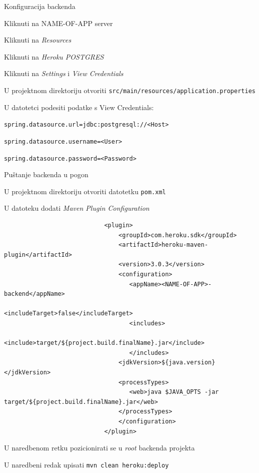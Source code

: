 				\begin{packed_item}
					\item Konfiguracija backenda
					\begin{packed_enum}
						\item Kliknuti na NAME-OF-APP server
						\item Kliknuti na \textit{Resources}
						\item Kliknuti na \textit{Heroku POSTGRES}
						\item Kliknuti na \textit{Settings} i \textit{View Credentials}
						\item U projektnom direktoriju otvoriti \texttt{src/main/resources/application.properties}
						\item U datotetci podesiti podatke s View Credentials:
							\begin{packed_item}
								\item \texttt{spring.datasource.url=jdbc:postgresql://<Host>}
								\item \texttt{spring.datasource.username=<User>}
								\item \texttt{spring.datasource.password=<Password>}
							\end{packed_item}
					\end{packed_enum}
				\end{packed_item}
			
					\begin{packed_item}
					\item Puštanje backenda u pogon
					\begin{packed_enum}
						\item U projektnom direktoriju otvoriti datotetku \texttt{pom.xml}
						\item U datoteku dodati \textit{Maven Plugin Configuration}
							\begin{verbatim}
							<plugin>
								<groupId>com.heroku.sdk</groupId>
								<artifactId>heroku-maven-plugin</artifactId>
								<version>3.0.3</version>
								<configuration>
								   <appName><NAME-OF-APP>-backend</appName>
								   <includeTarget>false</includeTarget>
								   <includes>
								     <include>target/${project.build.finalName}.jar</include>
								   </includes>
								<jdkVersion>${java.version}</jdkVersion>
								<processTypes>
								   <web>java $JAVA_OPTS -jar target/${project.build.finalName}.jar</web>
								</processTypes>
								</configuration>
							</plugin>
							\end{verbatim}
						\item U naredbenom retku pozicionirati se u \textit{root} backenda projekta
						\item U naredbeni redak upisati \texttt{mvn clean heroku:deploy}
					\end{packed_enum}
				\end{packed_item}
			
